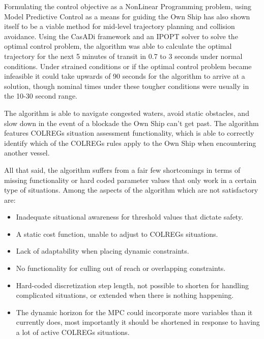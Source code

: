 Formulating the control objective as a NonLinear Programming problem, using Model Predictive Control as a means for guiding the Own Ship has also 
shown itself to be a viable method for mid-level trajectory planning and collision avoidance. Using the CasADi framework and an IPOPT solver to solve the
optimal control problem, the algorithm was able to calculate the optimal trajectory for the next 5 minutes of transit in 0.7 to 3 seconds under normal conditions.
Under strained conditions or if the optimal control problem became infeasible it could take upwards of 90 seconds for the algorithm to arrive at a solution, though
nominal times under these tougher conditions were usually in the 10-30 second range.

The algorithm is able to navigate congested waters, avoid static obstacles, and slow down in the event of a blockade the Own Ship can't get past.
The algorithm features COLREGs situation assessment functionality, which is able to correctly identify which of the COLREGs 
rules apply to the Own Ship when encountering another vessel.

All that said, the algorithm suffers from a fair few shortcomings in terms of missing functionality or hard coded parameter values that only work in a certain type
of situations. Among the aspects of the algorithm which are not satisfactory are: 
\begin{itemize}
    \item Inadequate situational awareness for threshold values that dictate safety.
    \item A static cost function, unable to adjust to COLREGs situations.
    \item Lack of adaptability when placing dynamic constraints.
    \item No functionality for culling out of reach or overlapping constraints.
    \item Hard-coded discretization step length, not possible to shorten for handling complicated situations, or extended when there is nothing happening.
    \item The dynamic horizon for the MPC could incorporate more variables than it currently does, most importantly it should be shortened in response to
    having a lot of active COLREGs situations.
\end{itemize}




\clearpage
